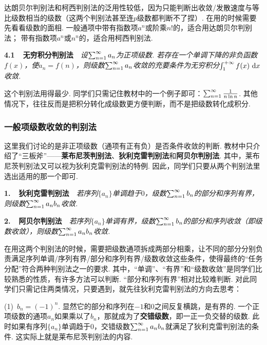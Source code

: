 达朗贝尔判别法和柯西判别法的泛用性较低，因为只能判断出收敛/发散速度与等比级数相当的级数（这两个判别法甚至连$p$级数都判断不了捏）.
在用的时候需要先看看级数的面相.
一般通项中带有指数项$a^n$或阶乘$n!$的，适合用达朗贝尔判别法；
带有指数项$a^n$或$n^n$的，适合用柯西判别法.\vspace{1em}

\textbf{4.1~~无穷积分判别法}~~\textit{设$\ss a_n$为正项级数. 若存在一个单调下降的非负函数$f(x)$，使$a_n = f(n)$，则级数$\ss a_n$收敛的充要条件为无穷积分$\int_{1}^{+\infty} f(x) ~\d x$收敛.}\vspace{0.5em}

这个判别法用得最少.
同学们只需记住教材中的一个例子即可：$\ss \frac{1}{n \ln n}$.
其他情况下，往往反而是把积分转化成级数更方便判断，而不是把级数转化成积分.

\subsubsection{一般项级数收敛的判别法}

这里我们讨论的是非正项级数（通项有正有负）是否条件收敛的判断.
教材中只介绍了“三板斧”——\textbf{莱布尼茨判别法}、\textbf{狄利克雷判别法}和\textbf{阿贝尔判别法}.
其中，莱布尼茨判别法又可以视为狄利克雷判别法的特例.
因此，同学们只要从两个判别法里选出适用的那一个即可.\vspace{1em}

\textbf{1.~~狄利克雷判别法}~~\textit{若序列$\{a_n \}$单调趋于$0$，级数$\ss b_n$的部分和序列有界，则级数$\ss a_n b_n$收敛.}\vspace{0.5em}

\textbf{2.~~阿贝尔判别法}~~\textit{若序列$\{a_n \}$单调有界，级数$\ss b_n$的部分和序列收敛（即级数收敛），则级数$\ss a_n b_n$收敛.}\vspace{1em}

在用这两个判别法的时候，需要把级数通项拆成两部分相乘，让不同的部分分别负责满足序列单调/序列有界/部分和序列有界/级数收敛这些条件，使得最终的“任务分配”符合两种判别法之一的要求.
其中，“单调”、“有界”和“级数收敛”是同学们比较熟悉的性质，有许多方法可以判断.
“部分和序列有界”相对比较难判断.
对此同学们只需记住两类情况，只要遇到，就先往狄利克雷判别法的方向去思考：

(1)~$b_n = (-1)^n$. 显然它的部分和序列在$-1$和$0$之间反复横跳，是有界的.
一个正项级数的通项$a_n$如果乘以了$b_n$，那就成为了\textbf{交错级数}，即一正一负交替的级数.
此时如果有序列$\{ a_n \}$单调趋于$0$，交错级数$\ss a_n b_n$就满足了狄利克雷判别法的条件.
这实际上就是莱布尼茨判别法的内容.

